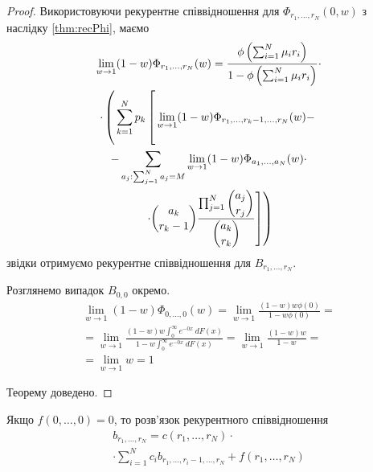 \documentclass{KnuBulletin}
\begin{document}
\begin{multicols}{2}
\begin{proof}
    Використовуючи рекурентне співвідношення для $\Phi_{r_1,\dots,r_N}(0,w)$
    з наслідку \ref{thm:recPhi}, маємо
    \begin{multline*}
    \lim_{w\rightarrow 1} (1-w)\Phi_{r_1,...,r_N}(w)
    =
    \frac
    { \phi\left(\sum_{i=1}^N \mu_i r_i\right)}
    {1- \phi\left(\sum_{i=1}^N \mu_i r_i\right)}
    \cdot\\\cdot
    \left(\vphantom{\sum_\sum}
    \sum_{k=1}^N p_k
    \left[\vphantom{\sum_\sum}
    \lim_{w\rightarrow 1} (1-w) \Phi_{r_1,\dots,r_{k}-1,\dots,r_N}(w)
    -
    \right.\right.\\\left.\left.
    -
    \sum_{a_j: \sum_{j=1}^N a_j = M}
    \lim_{w\rightarrow 1} (1-w) \Phi_{a_1,...,a_N}(w)
    \cdot
    \right.\right.\\\left.\left.
    \cdot
    \dbinom{a_k}{r_k-1}
    \frac{\prod_{j=1}^N \dbinom{a_j}{r_j}} {\dbinom{a_k}{r_k}}
    \right]
    \right)
    \end{multline*}
    звідки отримуємо рекурентне співвідношення для $B_{r_1,\dots,r_N}$. 
    
    Розглянемо випадок $B_{0,0}$ окремо.        
    \begin{multline*}
    \lim_{w\rightarrow 1} (1-w) \Phi_{0,\dots,0}(w) 
    = \lim_{w\rightarrow 1} \frac{(1-w) w \phi(0)}{1-w \phi(0)}
    = \\ =
    \lim_{w\rightarrow 1} \frac{(1-w) w \int_0^\infty e^{-0x}\ dF(x)}{1-w \int_0^\infty e^{-0x}\ dF(x)}  
    = \lim_{w\rightarrow 1} \frac{(1-w) w}{1-w}  
    = \\ =
    \lim_{w\rightarrow 1} w 
    =1
    \end{multline*}
    
    Теорему доведено.
\end{proof}


    \begin{lemma}
        \label{lem:rec}
        Якщо $f(0,\dots,0)=0$, то розв'язок рекурентного співвідношення
        \begin{multline*}
        b_{r_1,\dots,r_N}
        = c(r_1,\dots,r_N)
        \cdot\\\cdot
        \sum_{i=1}^{N} c_i b_{r_1,\dots,r_i-1,\dots,r_N}
        + f(r_1,\dots,r_N)
        \end{multline*}
        

\end{lemma}
\end{multicols}
\end{document}
